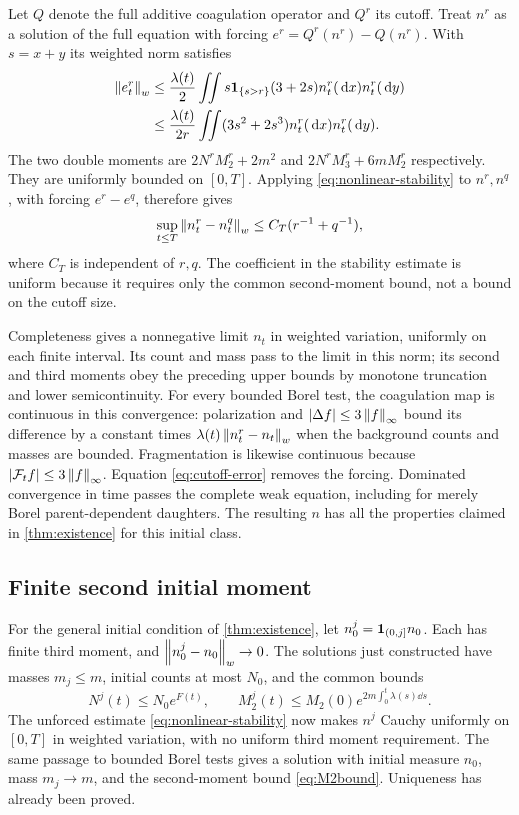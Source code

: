 Let $Q$ denote the full additive coagulation operator and $Q^r$ its
cutoff. Treat $n^r$ as a solution of the full equation with forcing
$e^r=Q^r(n^r)-Q(n^r)$. With $s=x+y$ its weighted norm satisfies
\begin{align}
 \left\lVert e_t^r\right\rVert_w
 &\leq\frac{\lambda(t)}2\iint s\mathbf 1_{\{s>r\}}(3+2s)
                       n_t^r(\,\mathrm d x)n_t^r(\,\mathrm d y)\notag\\
 &\leq\frac{\lambda(t)}{2r}\iint(3s^2+2s^3)
                       n_t^r(\,\mathrm d x)n_t^r(\,\mathrm d y).
 \label{eq:cutoff-error}
\end{align}
The two double moments are
$2N^rM_2^r+2m^2$ and $2N^rM_3^r+6mM_2^r$ respectively.
They are uniformly bounded on $[0,T]$. Applying
\eqref{eq:nonlinear-stability} to $n^r,n^q$, with forcing $e^r-e^q$,
therefore gives
\begin{equation}
 \sup_{t\leq T}\left\lVert n_t^r-n_t^q\right\rVert_w
 \leq C_T(r^{-1}+q^{-1}),
 \label{eq:cutoff-Cauchy}
\end{equation}
where $C_T$ is independent of $r,q$. The coefficient in the stability
estimate is uniform because it requires only the common second-moment
bound, not a bound on the cutoff size.

Completeness gives a nonnegative limit $n_t$ in weighted variation,
uniformly on each finite interval. Its count and mass pass to the limit
in this norm; its second and third moments obey the preceding upper
bounds by monotone truncation and lower semicontinuity. For every bounded
Borel test, the coagulation map is continuous in this convergence:
polarization and $|\Delta f|\leq3\left\lVert f\right\rVert_\infty$ bound its difference
by a constant times $\lambda(t)\left\lVert n^r_t-n_t\right\rVert_w$ when the background
counts and masses are bounded. Fragmentation is likewise continuous
because $|\mathcal F_t f|\leq3\left\lVert f\right\rVert_\infty$.
Equation \eqref{eq:cutoff-error} removes the forcing. Dominated convergence
in time passes the complete weak equation, including for merely Borel
parent-dependent daughters. The resulting $n$ has all the properties
claimed in \cref{thm:existence} for this initial class.

\subsection{Finite second initial moment}

For the general initial condition of \cref{thm:existence}, let
$n_0^j=\mathbf 1_{(0,j]}n_0$. Each has finite third moment, and
$\left\lVert n_0^j-n_0\right\rVert_w\to0$. The solutions just constructed have masses
$m_j\leq m$, initial counts at most $N_0$, and the common bounds
\begin{equation}
 N^j(t)\leq N_0e^{F(t)},\qquad
 M_2^j(t)\leq M_2(0)e^{2m\int_0^t\lambda(s)\dd s}.
 \label{eq:initial-approx-bounds}
\end{equation}
The unforced estimate \eqref{eq:nonlinear-stability} now makes $n^j$
Cauchy uniformly on $[0,T]$ in weighted variation, with no uniform third
moment requirement. The same passage to bounded Borel tests gives a
solution with initial measure $n_0$, mass $m_j\to m$, and the
second-moment bound \eqref{eq:M2bound}. Uniqueness has already been proved.

